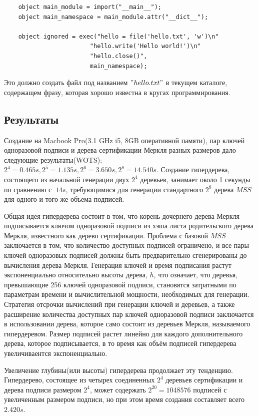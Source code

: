\documentclass[a4paper, 14pt]{extarticle}
\begin{document}
\begin{verbatim}
    object main_module = import("__main__");
    object main_namespace = main_module.attr("__dict__");

    object ignored = exec("hello = file('hello.txt', 'w')\n"
                        "hello.write('Hello world!')\n"
                        "hello.close()",
                        main_namespace);
\end{verbatim}

Это должно создать файл под названием $"hello.txt"$ в текущем каталоге, содержащем фразу, которая хорошо известна в кругах программирования.

\newpage

\subsection{Результаты}
Создание на Macbook Pro(3.1 GHz i5, 8GB оперативной памяти), пар ключей одноразовой подписи и дерева сертификации Меркля разных размеров дало следующие результаты(WOTS): $2^4 = 0.465s, 2^5 = 1.135s, 2^6 = 3.650s, 2^8 = 14.540s$. Создание гипердерева, состоящего из начальной генерации двух $2^4$ деревьев, занимает около 1 секунды по сравнению с $~14s$, требующимися для генерации стандартного $2^8$ дерева $MSS$ для одного и того же объема подписей. 

Общая идея гипердерева состоит в том, что корень дочернего дерева Меркля подписывается ключом одноразовой подписи из хэша листа родительского дерева Меркля, известного как дерево сертификации. Проблема с базовой $MSS$ заключается в том, что количество доступных подписей ограничено, и все пары ключей одноразовых подписей должны быть предварительно сгенерированы до вычисления дерева Меркля. Генерация ключей и время подписания растут экспоненциально относительно высоты дерева, $h$, что означает, что деревья, превышающие 256 ключей одноразовой подписи, становятся затратными по параметрам времени и вычислительной мощности, необходимых для генерации. Стратегия отсрочки вычислений при генерации ключей и деревьев, а также расширение количества доступных пар ключей одноразовой подписи заключается в использовании дерева, которое само состоит из деревьев Меркля, называемого гипердеревом. Размер подписей растет линейно для каждого дополнительного дерева, которое подписывается, в то время как объём подписей гипердерева увеличиваентся экспоненциально.

Увеличение глубины(или высоты) гипердерева продолжает эту тенденцию. Гипердерево, состоящее из четырех соединенных $2^4$ деревьев сертификации и дерева подписи размером $2^4$, может содержать $2^{20} = 1 048 576$ подписей с увеличенным размером подписи, но при этом время создания составляет всего $2.420s$.
\end{document}
